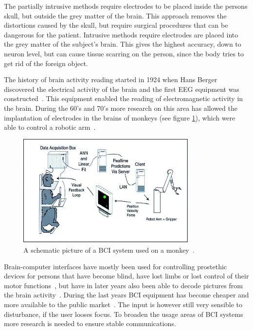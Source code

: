 The partially intrusive methods require electrodes to be placed inside the persons skull, but outside the grey matter of the brain. This approach removes the distortions caused by the skull, but require surgical procedures that can be dangerous for the patient. Intrusive methods require electrodes are placed into the grey matter of the subject's brain. This gives the highest accuracy, down to neuron level, but can cause tissue scarring on the person, since the body tries to get rid of the foreign object.

The history of brain activity reading started in 1924 when Hans Berger discovered the electrical activity of the brain and the first EEG equipment was constructed~\cite{haas2003hans}. This equipment enabled the reading of electromagnetic activity in the brain. During the 60's and 70's more research on this area has allowed the implantation of electrodes in the brains of monkeys (see figure \ref{apa}), which were able to control a robotic arm~\cite{GeorgopoulosLuritoPetridesEtAl89,lebedev2005cortical}. 

\begin{figure}[]
\includegraphics[width=0.8\textwidth] {bilder/apa.jpg}
\caption{A schematic picture of a BCI system used on a monkey~\cite{apa}.}
\label{apa}
\end{figure}

Brain-computer interfaces have mostly been used for controlling prostethic devices for persons that have become blind, have lost limbs or lost control of their motor functions~\cite{lebedev2006brain}, but have in later years also been able to decode pictures from the brain activity~\cite{miyawaki2008visual}.
During the last years BCI equipment has become cheaper and more available to the public market~\cite{legobrain}. The input is however still very sensible to disturbance, if the user looses focus. To broaden the usage areas of BCI systems more research is needed to ensure stable communications.

